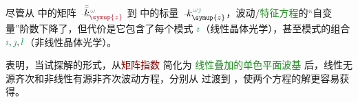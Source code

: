 尽管从  中的矩阵 $\Xint{\begin{smallmatrix} ~ \\ {}^{}_{\mathcolor{gray}{-}} \\ ~ \end{smallmatrix}}{15}{\bar{\bar{k}}}_{\textcolor{Maroon}{\symup{z}}}^{\;\! \mathcolor{gray}{\omega}}$ 到  中的标量 $\Xint{\begin{smallmatrix} ~ \\ {}^{}_{\mathcolor{gray}{-}} \\ ~ \end{smallmatrix}}{15}{k}_{\symup{z}}^{\;\! \mathcolor{gray}{\omega} \textcolor{ForestGreen}{\jmath}}$，波动/\textcolor{ForestGreen}{特征方程}的“自变量”阶数下降了，但代价是它包含了每个模式 $\textcolor{ForestGreen}{\imath}$（线性晶体光学），甚至模式的组合 $\textcolor{ForestGreen}{\imath},\textcolor{ForestGreen}{\jmath},\textcolor{ForestGreen}{l}$（非线性晶体光学）。

 表明，当试探解的形式，从\textcolor{Maroon}{矩阵指数}  简化为 \textcolor{ForestGreen}{线性叠加的单色平面波基} 后，线性无源齐次和非线性有源非齐次波动方程，分别从  过渡到 ，使两个方程的解更容易获得。

